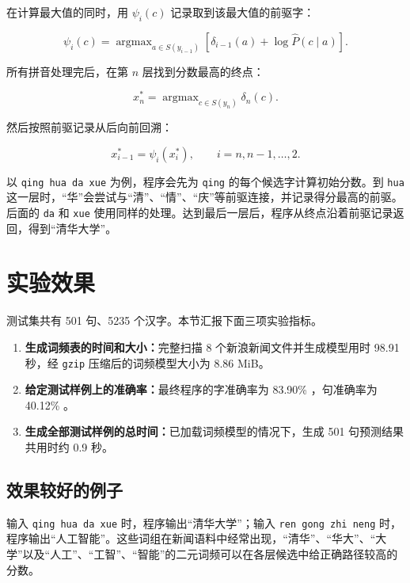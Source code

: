 \documentclass[11pt,a4paper]{ctexart}
\begin{document}
在计算最大值的同时，用 $\psi_i(c)$ 记录取到该最大值的前驱字：

\begin{equation}
\psi_i(c)=
\mathop{\arg\max}_{a\in S(y_{i-1})}
\left[\delta_{i-1}(a)+\log\widehat P(c\mid a)\right].
\end{equation}

所有拼音处理完后，在第 $n$ 层找到分数最高的终点：

\begin{equation}
x_n^*=\mathop{\arg\max}_{c\in S(y_n)}\delta_n(c).
\end{equation}

然后按照前驱记录从后向前回溯：

\begin{equation}
x_{i-1}^*=\psi_i(x_i^*),\qquad i=n,n-1,\ldots,2.
\end{equation}

以 \texttt{qing hua da xue} 为例，程序会先为 \texttt{qing} 的每个候选字计算初始分数。到 \texttt{hua} 这一层时，“华”会尝试与“清”、“情”、“庆”等前驱连接，并记录得分最高的前驱。后面的 \texttt{da} 和 \texttt{xue} 使用同样的处理。达到最后一层后，程序从终点沿着前驱记录返回，得到“清华大学”。

\section{实验效果}

测试集共有 501 句、5235 个汉字。本节汇报下面三项实验指标。

\begin{enumerate}[leftmargin=2.6em,label=\textbf{\arabic*.}]
  \item \textbf{生成词频表的时间和大小：}完整扫描 8 个新浪新闻文件并生成模型用时 98.91 秒，经 \texttt{gzip} 压缩后的词频模型大小为 8.86 MiB。
  \item \textbf{给定测试样例上的准确率：}最终程序的字准确率为 83.90\% ，句准确率为 40.12\% 。
  \item \textbf{生成全部测试样例的总时间：}已加载词频模型的情况下，生成 501 句预测结果共用时约 0.9 秒。
\end{enumerate}

\subsection{效果较好的例子}

输入 \texttt{qing hua da xue} 时，程序输出“清华大学”；输入 \texttt{ren gong zhi neng} 时，程序输出“人工智能”。这些词组在新闻语料中经常出现，“清华”、“华大”、“大学”以及“人工”、“工智”、“智能”的二元词频可以在各层候选中给正确路径较高的分数。
\end{document}
